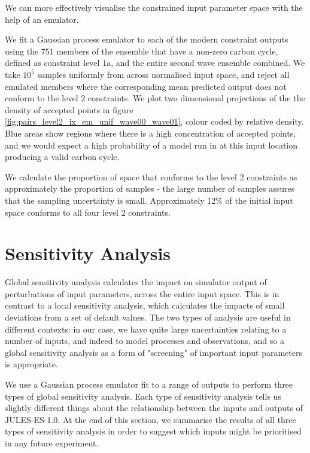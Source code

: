 \documentclass[gmd, manuscript]{copernicus}
\begin{document}
We can more effectively visualise the constrained input parameter space with the help of an emulator. 

We fit a Gaussian process emulator to each of the modern constraint outputs using the 751 members of the ensemble that have a non-zero carbon cycle, defined as constraint level 1a, and the entire second wave ensemble combined. We take $10^5$ samples uniformly from across normalised input space, and reject all emulated members where the corresponding mean predicted output does not conform to the level 2 constraints. We plot two dimensional projections of the the density of accepted points in figure \ref{fig:pairs_level2_ix_em_unif_wave00_wave01}, colour coded by relative density. Blue areas show regions where there is a high concentration of accepted points, and we would expect a high probability of a model run in at this input location producing a valid carbon cycle.

We calculate the proportion of space that conforms to the level 2 constraints as approximately the proportion of samples - the large number of samples assures that the sampling uncertainty is small. Approximately 12\% of the initial input space conforms to all four level 2 constraints.

\section{Sensitivity Analysis}\label{sec:sensitivity_analysis}

Global sensitivity analysis calculates the impact on simulator output of perturbations of input parameters, across the entire input space. This is in contrast to a local sensitivity analysis, which calculates the impacts of small deviations from a set of default values. The two types of analysis are useful in different contexts: in our case, we have quite large uncertainties relating to a number of inputs, and indeed to model processes and observations, and so a global sensitivity analysis as a form of "screening" of important input parameters is appropriate.

We use a Gaussian process emulator fit to a range of outputs to perform three types of global sensitivity analysis. Each type of sensitivity analysis tells us slightly different things about the relationship between the inputs and outputs of JULES-ES-1.0. At the end of this section, we summarise the results of all three types of sensitivity analysis in order to suggest which inputs might be prioritised in any future experiment.
\end{document}
